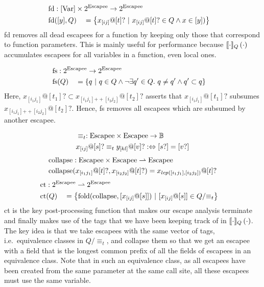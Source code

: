 \newcommand{\collapse}{\mathrm{collapse}}

\begin{alignat*}{3}
	\fd &: \mathrlap{[\Var] \times 2^{\Escapee} \to 2^{\Escapee}} \\
	\fd&([y], Q) &&= \left\{x_{[ij]}@[t]? \ |\ x_{[ij]}@[t]? \in Q \land x \in [y]) \right\}
\end{alignat*}
fd removes all dead escapees for a function by keeping only those that correspond to function parameters. This is mainly useful for performance because $\llbracket {\cdot} \rrbracket_Q \left( {\cdot} \right)$ accumulates escapees for all variables in a function, even local ones.

\newcommand{\concat}{\mathrm{++}}

\begin{alignat*}{3}
	\fs &: \mathrlap{2^{\Escapee} \to 2^{\Escapee}} \\
	\fs&(Q) &&= \left\{q \ |\ q \in Q \land \lnot \exists q' \in Q.\ q \neq q' \land q' \subset q\right\}
\end{alignat*}
Here, $x_{[i_1j_1]} @ [t_1]? \subset x_{[i_1j_1]\concat[i_2j_2]} @ [t_2]?$ asserts that $x_{[i_1j_1]} @ [t_1]?$ subsumes $x_{[i_1j_1]\concat[i_2j_2]} @ [t_2]?$. Hence, fs removes all escapees which are subsumed by another escapee.

\begin{alignat*}{1}
	&\equiv_t : \mathrm{Escapee} \times \mathrm{Escapee} \to \mathbb{B} \\
	&x_{[ij]} @ [s]? \equiv_t y_{[kl]} @ [v]? :\Leftrightarrow [s?] = [v?]
\end{alignat*}
\begin{align*}
	\collapse &: \Escapee \times \Escapee \rightharpoonup \Escapee \\
	\collapse&(x_{[i_1j_1]} @ [t]?, x_{[i_2j_2]} @ [t]?) = x_{lcp([i_1j_1], [i_2j_2])} @ [t]?
\end{align*}
\begin{alignat*}{3}
	\ct &: \mathrlap{2^{\Escapee} \rightharpoonup 2^{\Escapee}} \\
	\ct&(Q) &&= \left\{\mathrm{fold}(\collapse, [x_{[ij]} @ [s]])\ |\ [x_{[ij]} @ [s]] \in Q/{\equiv_t} \right\}
\end{alignat*}
ct is the key post-processing function that makes our escape analysis terminate and finally makes use of the tags that we have been keeping track of in $\llbracket {\cdot} \rrbracket_Q \left( {\cdot} \right)$. The key idea is that we take escapees with the same vector of tags, i.e.\ equivalence classes in $Q/{\equiv_t}$, and collapse them so that we get an escapee with a field that is the longest common prefix of all the fields of escapees in an equivalence class. Note that in such an equivalence class, as all escapees have been created from the same parameter at the same call site, all these escapees must use the same variable.

